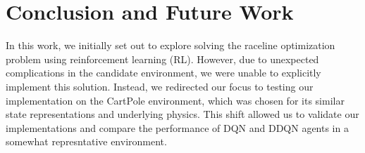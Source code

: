 \documentclass{article}
\begin{document}





\section{Conclusion and Future Work}

In this work, we initially set out to explore solving the raceline optimization problem using reinforcement learning (RL). However, due to unexpected complications in the candidate environment, we were unable to explicitly implement this solution. Instead, we redirected our focus to testing our implementation on the CartPole environment, which was chosen for its similar state representations and underlying physics. This shift allowed us to validate our implementations and compare the performance of DQN and DDQN agents in a somewhat represntative environment.
\end{document}
